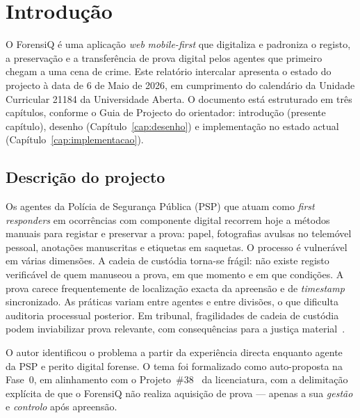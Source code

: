 
\section{Introdução}
\label{cap:introducao}

O ForensiQ é uma aplicação \emph{web} \emph{mobile-first} que digitaliza
e padroniza o registo, a preservação e a transferência de prova
digital pelos agentes que primeiro chegam a uma cena de crime. Este
relatório intercalar apresenta o estado do projecto à data de 6 de
Maio de 2026, em cumprimento do calendário da Unidade Curricular 21184
da Universidade Aberta. O documento está estruturado em três
capítulos, conforme o Guia de Projecto do orientador: introdução
(presente capítulo), desenho (Capítulo~\ref{cap:desenho}) e
implementação no estado actual (Capítulo~\ref{cap:implementacao}).

\subsection{Descrição do projecto}
\label{sec:descricao}

Os agentes da Polícia de Segurança Pública (PSP) que atuam como
\emph{first responders} em ocorrências com componente digital recorrem
hoje a métodos manuais para registar e preservar a prova: papel,
fotografias avulsas no telemóvel pessoal, anotações manuscritas e
etiquetas em saquetas. O processo é vulnerável em várias dimensões.
A cadeia de custódia torna-se frágil: não existe registo verificável
de quem manuseou a prova, em que momento e em que condições.
A prova carece frequentemente de localização exacta da apreensão e de
\emph{timestamp} sincronizado. As práticas variam entre agentes e entre
divisões, o que dificulta auditoria processual posterior. Em tribunal,
fragilidades de cadeia de custódia podem inviabilizar prova relevante,
com consequências para a justiça material~\citep{casey2011,acpo2012}.

O autor identificou o problema a partir da experiência directa
enquanto agente da PSP e perito digital forense. O tema foi formalizado
como auto-proposta na Fase~0, em alinhamento com o
Projeto~\#38~\citep{pestana2025} da licenciatura, com a delimitação
explícita de que o ForensiQ não realiza aquisição de prova ---
apenas a sua \emph{gestão} e \emph{controlo} após apreensão.

